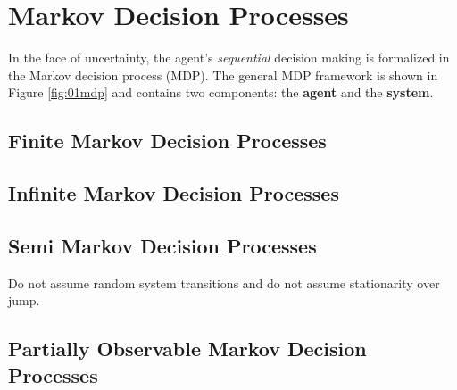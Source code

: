 %
%

\section{Markov Decision Processes}
In the face of uncertainty, the agent's \textit{sequential} decision making is formalized in the Markov decision process (MDP). The general MDP framework is shown in Figure \ref{fig:01mdp} and contains two components: the \textbf{agent} and the \textbf{system}.



\subsection{Finite Markov Decision Processes}
\subsection{Infinite Markov Decision Processes}
\subsection{Semi Markov Decision Processes}
Do not assume random system transitions and do not assume stationarity over jump.
\subsection{Partially Observable Markov Decision Processes}
